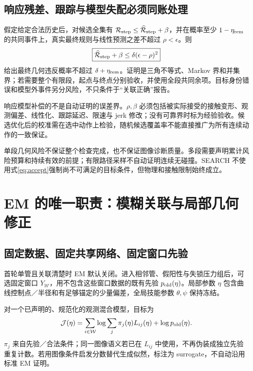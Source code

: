 \documentclass[UTF8,fontset=fandol,11pt,a4paper]{ctexart}
\theoremstyle{plain}
\theoremstyle{definition}
\theoremstyle{remark}
\numberwithin{equation}{section}
\begin{document}
\subsection{响应残差、跟踪与模型失配必须同账处理}
假定给定合法历史后，对候选全集有 $\mathcal R_{\rm step}\le\widehat{\mathcal R}_{\rm step}+\beta$，并在概率至少 $1-\eta_{\rm rem}$ 的共同事件上，真实最终规则与线性预测之差不超过 $\rho<\epsilon$。则
\begin{equation}
\boxed{\widehat{\mathcal R}_{\rm step}+\beta\le
\delta(\epsilon-\rho)^2}
\label{eq:accept}
\end{equation}
给出最终几何违反概率不超过 $\delta+\eta_{\rm rem}$。证明是三角不等式、Markov 界和并集界；若需要整个有限段，起点与终点分别验收，并使用全段共同余项。目标身份错误和模型外事件另分风险，不只条件于“关联正确”报告。

响应模型补偿的不是自动证明的误差界。$\rho,\beta$ 必须包括被实际接受的接触变形、观测偏差、线性化、跟踪延迟、限速与 jerk 修改；没有可靠界时标为经验验收。候选优化后的校准需在选中动作上检验，随机候选覆盖率不能直接推广为所有连续动作的一致保证。

单段几何风险不保证整个检查完成，也不保证图像诊断质量。多段需要声明累计风险预算和持续有效的前提；有限路径采样不自动证明连续无碰撞。SEARCH 不使用式\eqref{eq:accept}强制尚不可满足的目标条件，但物理和接触限制始终成立。

\section{EM 的唯一职责：模糊关联与局部几何修正}
\label{sec:em}
\subsection{固定数据、固定共享网络、固定窗口先验}
首轮单管且关联清楚时 EM 默认关闭。进入相邻管、假阳性与失锁压力组后，可选固定窗口 $Y_{\mathcal W}$，用不包含这些窗口数据的既有先验 $p_{\rm old}(\eta)$。局部参数 $\eta$ 包含曲线控制点／半径和有足够锚定的少量偏差，全局技能参数 $\theta,\psi$ 保持冻结。

对一个已声明的、规范化的观测混合模型，目标为
\begin{equation}
\mathcal J(\eta)=\sum_{i\in\mathcal W}
\log\sum_j\pi_j(\eta)L_{ij}(\eta)+\log p_{\rm old}(\eta).
\label{eq:emobj}
\end{equation}
$\pi_j$ 来自先验／合法条件；同一图像语义若已在 $L_{ij}$ 中使用，不再伪装成独立先验重复计数。若用图像条件启发分数替代生成似然，标注为 surrogate，不自动沿用标准 EM 证明。
\end{document}
